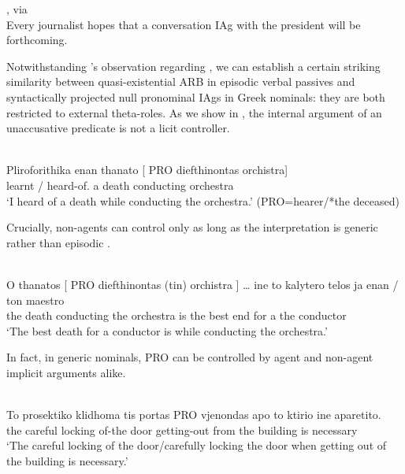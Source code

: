 \documentclass[output=paper]{langsci/langscibook}
\begin{document}
\ea%
    \label{ex:key:22.29} \textcite{Bruening2014}, via
    \textcite[238]{AlexiadouEtAl2015}\\
    Every journalist hopes that a conversation
    \gls{IAg} with the president will be forthcoming.
\z

Notwithstanding \citeauthor{AlexiadouEtAl2015}'s observation regarding , we
can establish a certain striking similarity between quasi-existential ARB in
episodic verbal passives and syntactically projected null pronominal \glspl{IAg} in
Greek nominals: they are both restricted to external theta-roles. As we show in
, the internal argument of an unaccusative predicate is not a
licit controller.

\ea\label{ex:key:22.30} \\
    \gll    Pliroforithika      enan thanato [ PRO diefthinontas orchistra]\\
            {learnt / heard-of.\Fsg} a  death {} {}     conducting
            orchestra\\
    \glt    \enquote*{I heard of a death while conducting the orchestra.} (PRO=hearer/*the deceased)
\z

Crucially, non-agents can control only as long as the interpretation is generic
rather than episodic .

\ea%
    \label{ex:key:22.31} \\
    \gll    O     thanatos   [ PRO diefthinontas (tin) orchistra ] \dots{} ine to   kalytero  telos  ja  enan / ton  maestro\\
            the  death {} {} conducting the  orchestra {} {} is  the best  end for  a  {} the  conductor\\
    \glt    \enquote*{The best death for a conductor is while conducting the orchestra.}
\z

In fact, in generic nominals, PRO can be controlled by agent and non-agent
implicit arguments alike.

\ea%
    \label{ex:key:22.32n} \\
    \gll    To prosektiko klidhoma tis portas PRO vjenondas apo to ktirio ine aparetito.\\
            the	careful locking of-the door {} getting-out from the building is necessary\\
    \glt    \enquote*{The careful locking of the door/carefully locking the
    door when getting out of the building is necessary.}
\z
\end{document}
